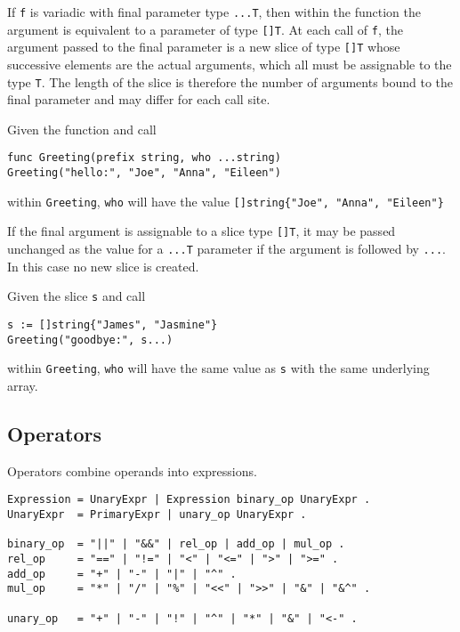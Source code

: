 If \texttt{f} is variadic with final parameter type \texttt{...T}, then
within the function the argument is equivalent to a parameter of type
\texttt{{[}{]}T}. At each call of \texttt{f}, the argument passed to the
final parameter is a new slice of type \texttt{{[}{]}T} whose successive
elements are the actual arguments, which all must be
assignable to the type \texttt{T}. The length
of the slice is therefore the number of arguments bound to the final
parameter and may differ for each call site.

Given the function and call

\begin{Verbatim}[frame=single]
func Greeting(prefix string, who ...string)
Greeting("hello:", "Joe", "Anna", "Eileen")
\end{Verbatim}

within \texttt{Greeting}, \texttt{who} will have the value
\texttt{{[}{]}string\{"Joe", "Anna", "Eileen"\}}

If the final argument is assignable to a slice type \texttt{{[}{]}T}, it
may be passed unchanged as the value for a \texttt{...T} parameter if
the argument is followed by \texttt{...}. In this case no new slice is
created.

Given the slice \texttt{s} and call

\begin{Verbatim}[frame=single]
s := []string{"James", "Jasmine"}
Greeting("goodbye:", s...)
\end{Verbatim}

within \texttt{Greeting}, \texttt{who} will have the same value as
\texttt{s} with the same underlying array.

\subsection*{Operators}

Operators combine operands into expressions.

\begin{Verbatim}[frame=single]
Expression = UnaryExpr | Expression binary_op UnaryExpr .
UnaryExpr  = PrimaryExpr | unary_op UnaryExpr .

binary_op  = "||" | "&&" | rel_op | add_op | mul_op .
rel_op     = "==" | "!=" | "<" | "<=" | ">" | ">=" .
add_op     = "+" | "-" | "|" | "^" .
mul_op     = "*" | "/" | "%" | "<<" | ">>" | "&" | "&^" .

unary_op   = "+" | "-" | "!" | "^" | "*" | "&" | "<-" .
\end{Verbatim}

